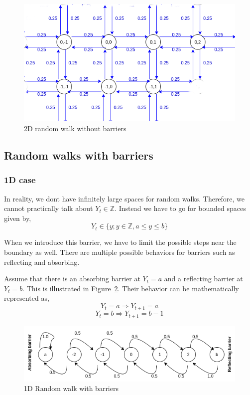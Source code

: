 \documentclass[a4paper]{article}
\newcommand\figref{Figure~\ref}
\begin{document}
\begin{figure}[h]
    \centering
    \includegraphics[width=\textwidth]{2d-unbounded.png}
    \caption{2D random walk without barriers}
    \label{fig:2d-unbounded}
\end{figure}

\subsection{Random walks with barriers}

\subsubsection{1D case}
In reality, we dont have infinitely large spaces for random walks. Therefore, we cannot practically talk about $Y_t \in \mathbb{Z}$. Instead we have to go for bounded spaces given by,
$$Y_t \in \{y; y\in\mathbb{Z}, a\leq y \leq b\}$$

When we introduce this barrier, we have to limit the possible steps near the boundary as well. There are multiple possible behaviors for barriers such as reflecting and absorbing. 

Assume that there is an absorbing barrier at $Y_t = a$ and a reflecting barrier at $Y_t = b$. This is illustrated in \figref{fig:1d-bounded}. Their behavior can be mathematically represented as,
$$Y_t = a \Rightarrow Y_{t+1}=a$$
$$Y_t = b \Rightarrow Y_{t+1}=b-1$$

\begin{figure}[h]
    \centering
    \includegraphics[width=\textwidth]{1d-bounded.png}
    \caption{1D Random walk with barriers}
    \label{fig:1d-bounded}
\end{figure}
\end{document}
